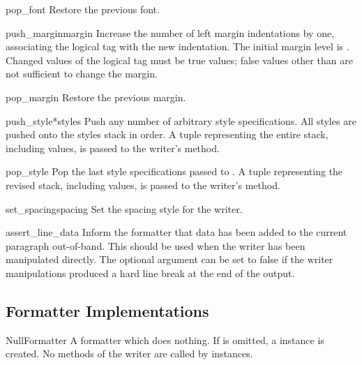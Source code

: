 \begin{funcdesc}{pop_font}{}
Restore the previous font.
\end{funcdesc}

\begin{funcdesc}{push_margin}{margin}
Increase the number of left margin indentations by one, associating
the logical tag  with the new indentation.  The initial
margin level is .  Changed values of the logical tag must be
true values; false values other than  are not sufficient
to change the margin.
\end{funcdesc}

\begin{funcdesc}{pop_margin}{}
Restore the previous margin.
\end{funcdesc}

\begin{funcdesc}{push_style}{*styles}
Push any number of arbitrary style specifications.  All styles are
pushed onto the styles stack in order.  A tuple representing the
entire stack, including  values, is passed to the writer's
 method.
\end{funcdesc}

\begin{funcdesc}{pop_style}{}
Pop the last  style specifications passed to
.  A tuple representing the revised stack,
including  values, is passed to the writer's
 method.
\end{funcdesc}

\begin{funcdesc}{set_spacing}{spacing}
Set the spacing style for the writer.
\end{funcdesc}

\begin{funcdesc}{assert_line_data}{}
Inform the formatter that data has been added to the current paragraph
out-of-band.  This should be used when the writer has been manipulated
directly.  The optional  argument can be set to false if
the writer manipulations produced a hard line break at the end of the
output.
\end{funcdesc}


\subsection{Formatter Implementations}

\begin{funcdesc}{NullFormatter}{}
A formatter which does nothing.  If  is omitted, a
 instance is created.  No methods of the writer are
called by  instances.
\end{funcdesc}

